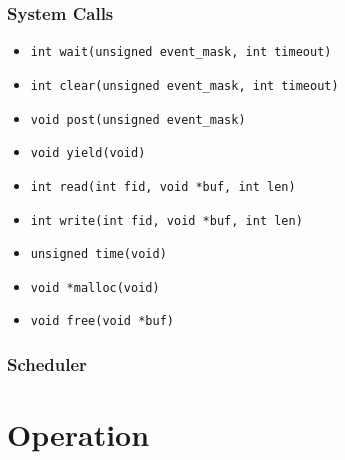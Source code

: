 \documentclass{gqtekspec}
\begin{document}
\subsection{System Calls}
\begin{itemize}
\item {\tt int wait(unsigned event\_mask, int timeout)}
\item {\tt int clear(unsigned event\_mask, int timeout)}
\item {\tt void post(unsigned event\_mask)}
\item {\tt void yield(void) }
\item {\tt int read(int fid, void *buf, int len)}
\item {\tt int write(int fid, void *buf, int len)}
\item {\tt unsigned time(void) }
\item {\tt void *malloc(void)}
\item {\tt void free(void *buf)}
\end{itemize}
\subsection{Scheduler}

\chapter{Operation}
\end{document}
